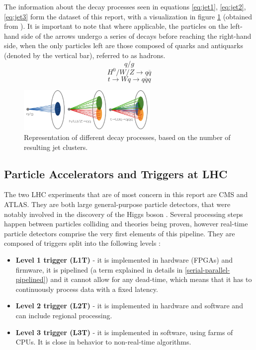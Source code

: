The information about the decay processes seen in equations \ref{eq:jet1}, \ref{eq:jet2}, \ref{eq:jet3} form the dataset of this report, with a visualization in figure \ref{fig:jedi-jets} (obtained from \cite{9-newman2019jedi-net:}). It is important to note that where applicable, the particles on the left-hand side of the arrows undergo a series of decays before reaching the right-hand side, when the only particles left are those composed of quarks and antiquarks (denoted by the vertical bar), referred to as hadrons.
\begin{equation}\label{eq:jet1}
  q / g
\end{equation}
\begin{equation}\label{eq:jet2}
  H^0 / W / Z \rightarrow q\overline{q}
\end{equation}
\begin{equation}\label{eq:jet3}
  t \rightarrow Wq \rightarrow q\overline{q}q
\end{equation}

\begin{figure}[hpt!]
  \centering
  \includegraphics[trim={0cm 0cm 0cm 0cm}, width=0.6\textwidth, center]{background/jedi_jets.png}
  \caption{Representation of different decay processes, based on the number of resulting jet clusters.}
  \label{fig:jedi-jets}
\end{figure}

\subsection{Particle Accelerators and Triggers at LHC}\label{triggers}
The two LHC experiments that are of most concern in this report are CMS and ATLAS. They are both large general-purpose particle detectors, that were notably involved in the discovery of the Higgs boson \cite{47-greeene2013higgs}. Several processing steps happen between particles colliding and theories being proven, however real-time particle detectors comprise the very first elements of this pipeline. They are composed of triggers split into the following levels \citep[p.16]{48-trigger}:

\begin{itemize}
  \item \textbf{Level 1 trigger (L1T)} - it is implemented in hardware (FPGAs) and firmware, it is pipelined (a term explained in details in \autoref{serial-parallel-pipelined}) and it cannot allow for any dead-time, which means that it has to continuously process data with a fixed latency.
  \item \textbf{Level 2 trigger (L2T)} - it is implemented in hardware and software and can include regional processing.
  \item \textbf{Level 3 trigger (L3T)} - it is implemented in software, using farms of CPUs. It is close in behavior to non-real-time algorithms.
\end{itemize}

